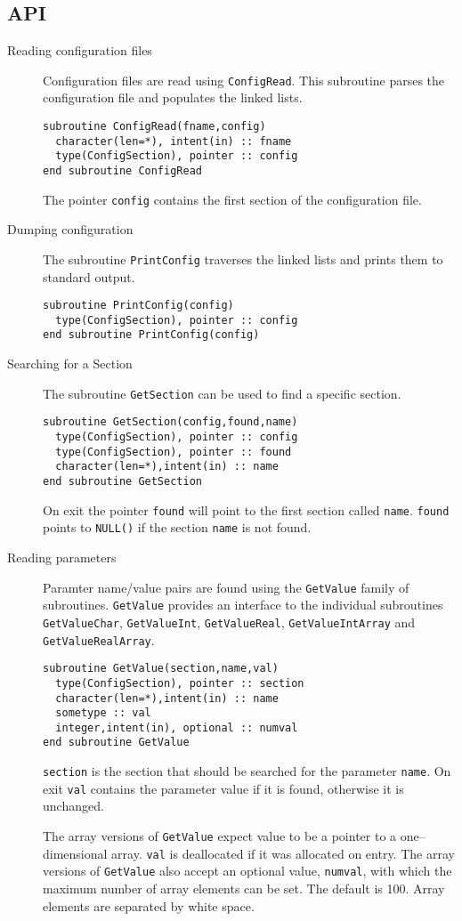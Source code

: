 \subsection{API}
\begin{description}
\item[Reading configuration files] Configuration files are read using \texttt{ConfigRead}. This subroutine parses the configuration file and populates the linked lists.
\begin{verbatim}
subroutine ConfigRead(fname,config)
  character(len=*), intent(in) :: fname
  type(ConfigSection), pointer :: config
end subroutine ConfigRead
\end{verbatim}
The pointer \texttt{config} contains the first section of the configuration file.
\item[Dumping configuration] The subroutine \texttt{PrintConfig} traverses the linked lists and prints them to standard output.
\begin{verbatim}
subroutine PrintConfig(config)
  type(ConfigSection), pointer :: config
end subroutine PrintConfig(config)
\end{verbatim}
\item[Searching for a Section] The subroutine \texttt{GetSection} can be used to find a specific section.
\begin{verbatim}
subroutine GetSection(config,found,name)
  type(ConfigSection), pointer :: config
  type(ConfigSection), pointer :: found
  character(len=*),intent(in) :: name
end subroutine GetSection
\end{verbatim}
On exit the pointer \texttt{found} will point to the first section called \texttt{name}. \texttt{found} points to \texttt{NULL()} if the section \texttt{name} is not found.
\item[Reading parameters] Paramter name/value pairs are found using the \texttt{GetValue} family of subroutines. \texttt{GetValue} provides an interface to the individual subroutines \texttt{GetValueChar}, \texttt{GetValueInt}, \texttt{GetValueReal}, \texttt{GetValueIntArray} and \texttt{GetValueRealArray}.
\begin{verbatim}
subroutine GetValue(section,name,val)
  type(ConfigSection), pointer :: section
  character(len=*),intent(in) :: name
  sometype :: val
  integer,intent(in), optional :: numval
end subroutine GetValue
\end{verbatim}
\texttt{section} is the section that should be searched for the parameter \texttt{name}. On exit \texttt{val} contains the parameter value if it is found, otherwise it is unchanged. 

The array versions of \texttt{GetValue} expect value to be a pointer to a one--dimensional array. \texttt{val} is deallocated if it was allocated on entry. The array versions of \texttt{GetValue} also accept an optional value, \texttt{numval}, with which the maximum number of array elements can be set. The default is 100. Array elements are separated by white space.
\end{description}
